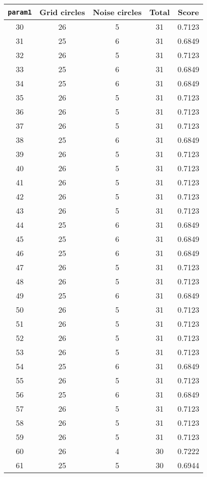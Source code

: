 \documentclass[letterpaper, 12pt]{article}
\begin{document}
\begin{longtable}{|c|c|c|c|c|}
\hline
\textbf{\texttt{param1}} & \textbf{Grid circles} & \textbf{Noise circles} & \textbf{Total} & \textbf{Score} \\
\hline
30 & 26 & 5 & 31 & 0.7123 \\
\hline
31 & 25 & 6 & 31 & 0.6849 \\
\hline
32 & 26 & 5 & 31 & 0.7123 \\
\hline
33 & 25 & 6 & 31 & 0.6849 \\
\hline
34 & 25 & 6 & 31 & 0.6849 \\
\hline
35 & 26 & 5 & 31 & 0.7123 \\
\hline
36 & 26 & 5 & 31 & 0.7123 \\
\hline
37 & 26 & 5 & 31 & 0.7123 \\
\hline
38 & 25 & 6 & 31 & 0.6849 \\
\hline
39 & 26 & 5 & 31 & 0.7123 \\
\hline
40 & 26 & 5 & 31 & 0.7123 \\
\hline
41 & 26 & 5 & 31 & 0.7123 \\
\hline
42 & 26 & 5 & 31 & 0.7123 \\
\hline
43 & 26 & 5 & 31 & 0.7123 \\
\hline
44 & 25 & 6 & 31 & 0.6849 \\
\hline
45 & 25 & 6 & 31 & 0.6849 \\
\hline
46 & 25 & 6 & 31 & 0.6849 \\
\hline
47 & 26 & 5 & 31 & 0.7123 \\
\hline
48 & 26 & 5 & 31 & 0.7123 \\
\hline
49 & 25 & 6 & 31 & 0.6849 \\
\hline
50 & 26 & 5 & 31 & 0.7123 \\
\hline
51 & 26 & 5 & 31 & 0.7123 \\
\hline
52 & 26 & 5 & 31 & 0.7123 \\
\hline
53 & 26 & 5 & 31 & 0.7123 \\
\hline
54 & 25 & 6 & 31 & 0.6849 \\
\hline
55 & 26 & 5 & 31 & 0.7123 \\
\hline
56 & 25 & 6 & 31 & 0.6849 \\
\hline
57 & 26 & 5 & 31 & 0.7123 \\
\hline
58 & 26 & 5 & 31 & 0.7123 \\
\hline
59 & 26 & 5 & 31 & 0.7123 \\
\hline
60 & 26 & 4 & 30 & 0.7222 \\
\hline
61 & 25 & 5 & 30 & 0.6944 \\

\end{longtable}
\end{document}
